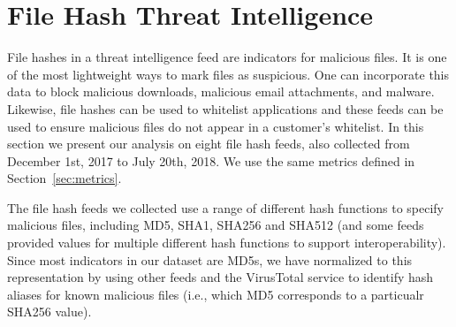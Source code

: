\section{File Hash Threat Intelligence}
\label{sec:hash-analysis}

File hashes in a threat intelligence feed are indicators for malicious
files. It is one of the most lightweight ways to mark files as
suspicious. One can incorporate this data to block malicious
downloads, malicious email attachments, and malware. Likewise, file
hashes can be used to whitelist applications and these feeds can be
used to ensure malicious files do not appear in a customer's
whitelist. In this section we present our analysis on
eight file hash feeds, also collected from December 1st, 2017
to July 20th, 2018. We use the same metrics defined in
Section~\ref{sec:metrics}.

The file hash feeds we collected use a range of different hash
functions to specify malicious files, including MD5, SHA1, SHA256 and
SHA512 (and some feeds provided values for multiple different hash
functions to support interoperability).  Since most indicators in our
dataset are MD5s, we have normalized to this representation by using other
feeds and the VirusTotal service to identify hash aliases for known
malicious files (i.e., which MD5 corresponds to a particualr SHA256
value).  


